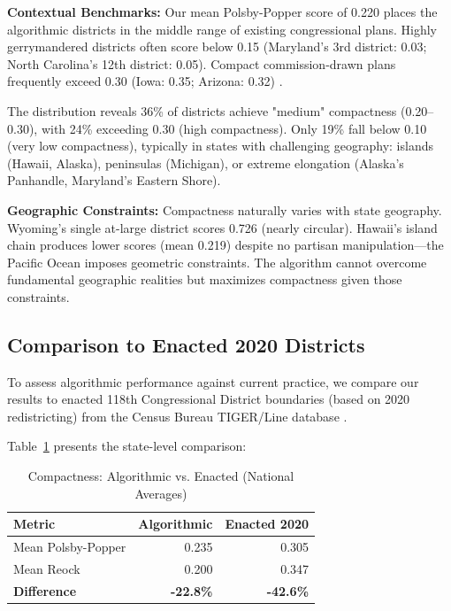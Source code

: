 \textbf{Contextual Benchmarks:} Our mean Polsby-Popper score of 0.220 places the algorithmic districts in the middle range of existing congressional plans. Highly gerrymandered districts often score below 0.15 (Maryland's 3rd district: 0.03; North Carolina's 12th district: 0.05). Compact commission-drawn plans frequently exceed 0.30 (Iowa: 0.35; Arizona: 0.32) \cite{deford2019implementing}.

The distribution reveals 36\% of districts achieve "medium" compactness (0.20--0.30), with 24\% exceeding 0.30 (high compactness). Only 19\% fall below 0.10 (very low compactness), typically in states with challenging geography: islands (Hawaii, Alaska), peninsulas (Michigan), or extreme elongation (Alaska's Panhandle, Maryland's Eastern Shore).

\textbf{Geographic Constraints:} Compactness naturally varies with state geography. Wyoming's single at-large district scores 0.726 (nearly circular). Hawaii's island chain produces lower scores (mean 0.219) despite no partisan manipulation—the Pacific Ocean imposes geometric constraints. The algorithm cannot overcome fundamental geographic realities but maximizes compactness given those constraints.

\subsection{Comparison to Enacted 2020 Districts}

To assess algorithmic performance against current practice, we compare our results to enacted 118th Congressional District boundaries (based on 2020 redistricting) from the Census Bureau TIGER/Line database \cite{census2023tigerline}.

Table~\ref{tab:baseline_comparison} presents the state-level comparison:

\begin{table}[h]
\centering
\caption{Compactness: Algorithmic vs. Enacted (National Averages)}
\label{tab:baseline_comparison}
\begin{tabular}{lrr}
\toprule
\textbf{Metric} & \textbf{Algorithmic} & \textbf{Enacted 2020} \\
\midrule
Mean Polsby-Popper & 0.235 & 0.305 \\
Mean Reock & 0.200 & 0.347 \\
\midrule
\textbf{Difference} & \textbf{-22.8\%} & \textbf{-42.6\%} \\
\bottomrule
\end{tabular}
\end{table}

